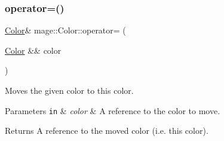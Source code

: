 \subsubsection{\texorpdfstring{operator=()}{operator=()}\hspace{0.1cm}{\footnotesize\ttfamily [2/2]}}
{\footnotesize\ttfamily \hyperlink{structmage_1_1_color}{Color}\& mage\+::\+Color\+::operator= (\begin{DoxyParamCaption}\item[{\hyperlink{structmage_1_1_color}{Color} \&\&}]{color }\end{DoxyParamCaption})\hspace{0.3cm}{\ttfamily [default]}}

Moves the given color to this color.


\begin{DoxyParams}[1]{Parameters}
\mbox{\tt in}  & {\em color} & A reference to the color to move. \\
\hline
\end{DoxyParams}
\begin{DoxyReturn}{Returns}
A reference to the moved color (i.\+e. this color). 
\end{DoxyReturn}
